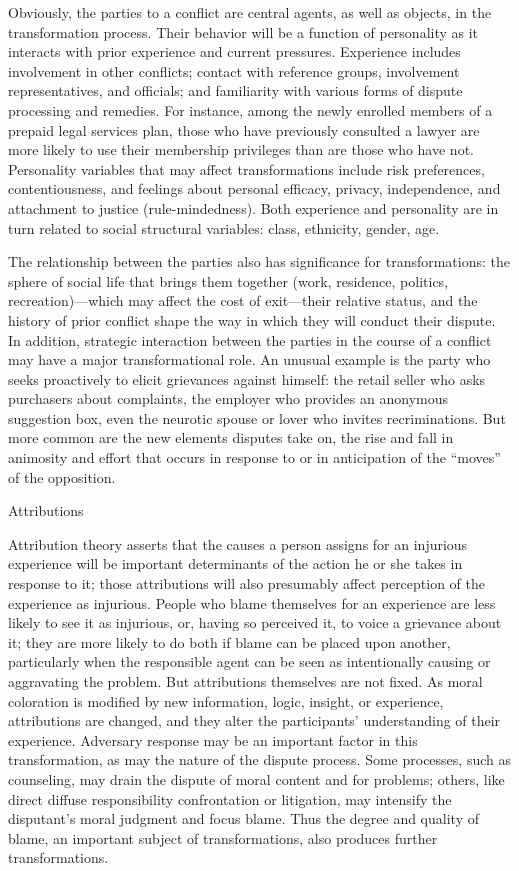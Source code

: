 \documentclass[11pt,letterpaper,twoside]{article}
\begin{document}
Obviously, the parties to a conflict are central agents, as well as
objects, in the transformation process. Their behavior will be a
function of personality as it interacts with prior experience and
current pressures. Experience includes involvement in other conflicts;
contact with reference groups, involvement representatives, and
officials; and familiarity with various forms of dispute processing and
remedies. For instance, among the newly enrolled members of a prepaid
legal services plan, those who have previously consulted a lawyer are
more likely to use their membership privileges than are those who have
not. Personality variables that may affect transformations include risk
preferences, contentiousness, and feelings about personal efficacy,
privacy, independence, and attachment to justice (rule-mindedness). Both
experience and personality are in turn related to social structural
variables: class, ethnicity, gender, age.

The relationship between the parties also has significance for
transformations: the sphere of social life that brings them together
(work, residence, politics, recreation)---which may affect the cost of
exit---their relative status, and the history of prior conflict shape
the way in which they will conduct their dispute. In addition, strategic
interaction between the parties in the course of a conflict may have a
major transformational role. An unusual example is the party who seeks
proactively to elicit grievances against himself: the retail seller who
asks purchasers about complaints, the employer who provides an anonymous
suggestion box, even the neurotic spouse or lover who invites
recriminations. But more common are the new elements disputes take on,
the rise and fall in animosity and effort that occurs in response to or
in anticipation of the ``moves'' of the opposition.

{Attributions}

Attribution theory asserts that the causes a person assigns for an
injurious experience will be important determinants of the action he or
she takes in response to it; those attributions will also presumably
affect perception of the experience as injurious. People who blame
themselves for an experience are less likely to see it as injurious, or,
having so perceived it, to voice a grievance about it; they are more
likely to do both if blame can be placed upon another, particularly when
the responsible agent can be seen as intentionally causing or
aggravating the problem. But attributions themselves are not fixed. As
moral coloration is modified by new information, logic, insight, or
experience, attributions are changed, and they alter the participants'
understanding of their experience. Adversary response may be an
important factor in this transformation, as may the nature of the
dispute process. Some processes, such as counseling, may drain the
dispute of moral content and for problems; others, like direct diffuse
responsibility confrontation or litigation, may intensify the
disputant's moral judgment and focus blame. Thus the degree and quality
of blame, an important subject of transformations, also produces further
transformations.
\end{document}
